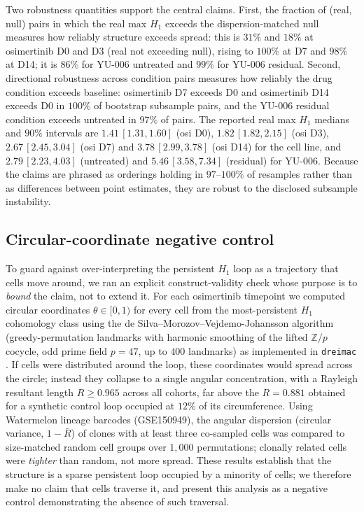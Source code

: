 Two robustness quantities support the central claims. First, the
fraction of (real, null) pairs in which the real max $H_1$ exceeds the
dispersion-matched null measures how reliably structure exceeds
spread: this is $31\%$ and $18\%$ at osimertinib D0 and D3 (real
not exceeding null), rising to $100\%$ at D7 and $98\%$ at D14; it is
$86\%$ for YU-006 untreated and $99\%$ for YU-006 residual. Second,
directional robustness across condition pairs measures how reliably
the drug condition exceeds baseline: osimertinib D7 exceeds D0 and
osimertinib D14 exceeds D0 in $100\%$ of bootstrap subsample pairs,
and the YU-006 residual condition exceeds untreated in $97\%$ of
pairs. The reported real max $H_1$ medians and $90\%$ intervals are
$1.41\,[1.31, 1.60]$ (osi D0), $1.82\,[1.82, 2.15]$ (osi D3),
$2.67\,[2.45, 3.04]$ (osi D7) and $3.78\,[2.99, 3.78]$ (osi D14) for
the cell line, and $2.79\,[2.23, 4.03]$ (untreated) and
$5.46\,[3.58, 7.34]$ (residual) for YU-006. Because the claims are
phrased as orderings holding in $97$--$100\%$ of resamples rather than
as differences between point estimates, they are robust to the
disclosed subsample instability.

\subsection*{Circular-coordinate negative control}

To guard against over-interpreting the persistent $H_1$ loop as a
trajectory that cells move around, we ran an explicit construct-validity
check whose purpose is to \emph{bound} the claim, not to extend it. For
each osimertinib timepoint we computed circular coordinates
$\theta \in [0, 1)$ for every cell from the most-persistent $H_1$
cohomology class using the de Silva--Morozov--Vejdemo-Johansson
algorithm (greedy-permutation landmarks with harmonic smoothing of the
lifted $\mathbb{Z}/p$ cocycle, odd prime field $p = 47$, up to $400$
landmarks) as implemented in \texttt{dreimac}
\citep{perea2023}. If cells were distributed around the loop, these
coordinates would spread across the circle; instead they collapse to a
single angular concentration, with a Rayleigh resultant length
$R \geq 0.965$ across all cohorts, far above the $R = 0.881$ obtained
for a synthetic control loop occupied at $12\%$ of its circumference.
Using Watermelon lineage barcodes (GSE150949), the angular dispersion
(circular variance, $1 - \bar{R}$) of clones with at least three
co-sampled cells was compared to size-matched random cell groups over
$1{,}000$ permutations; clonally related cells were \emph{tighter} than
random, not more spread. These results establish that the structure is
a sparse persistent loop occupied by a minority of cells; we therefore
make no claim that cells traverse it, and present this analysis as a
negative control demonstrating the absence of such traversal.

